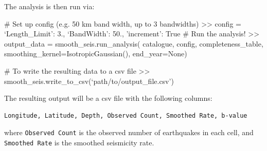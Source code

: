 The analysis is then run via:

\begin{python}[frame=single]
# Set up config (e.g. 50 km band width, up to 3 bandwidths)
>> config = {`Length_Limit': 3.,
             `BandWidth': 50.,
             'increment': True}
# Run the analysis!
>> output_data = smooth_seis.run_analysis(
    catalogue,
    config,
    completeness_table, 
    smoothing_kernel=IsotropicGaussian(), 
    end_year=None)

# To write the resulting data to a csv file
>> smooth_seis.write_to_csv(`path/to/output_file.csv')
\end{python}

The resulting output will be a csv file with the following columns:
\begin{Verbatim}[frame=single, commandchars=\\\{\}, fontsize=\scriptsize]
Longitude, Latitude, Depth, Observed Count, Smoothed Rate, b-value
\end{Verbatim}

\noindent where \verb=Observed Count= is the observed number of earthquakes in each cell, and \\ 
\verb=Smoothed Rate= is the smoothed seismicity rate.







